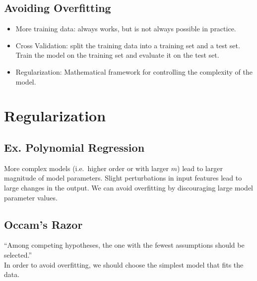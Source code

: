\documentclass[12pt]{article}
\begin{document}
        \subsection{Avoiding Overfitting}
            \begin{itemize}
                \item More training data: always works, but is not always possible in practice.
                \item Cross Validation: split the training data into a training set and a test set. Train the model on the training set and evaluate it on the test set.
                \item Regularization: Mathematical framework for controlling the complexity of the model.
            \end{itemize}
    \section{Regularization}
        \subsection{Ex. Polynomial Regression}
            More complex models (i.e.\ higher order or with larger $m$) lead to larger magnitude of model parameters.
            Slight perturbations in input features lead to large changes in the output.
            We can avoid overfitting by discouraging large model parameter values.
        \subsection{Occam's Razor}
            ``Among competing hypotheses, the one with the fewest assumptions should be selected.'' \\
            In order to avoid overfitting, we should choose the simplest model that fits the data.
\end{document}
